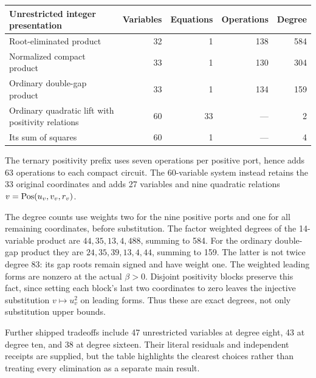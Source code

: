 \begin{center}
\small
\begin{tabular}{@{}lrrrr@{}}
\toprule
Unrestricted integer presentation & Variables & Equations & Operations & Degree\\
\midrule
Root-eliminated product & 32 & 1 & 138 & 584\\
Normalized compact product & 33 & 1 & 130 & 304\\
Ordinary double-gap product & 33 & 1 & 134 & 159\\
Ordinary quadratic lift with positivity relations & 60 & 33 & --- & 2\\
Its sum of squares & 60 & 1 & --- & 4\\
\bottomrule
\end{tabular}
\end{center}
The ternary positivity prefix uses seven operations per positive port, hence adds 63 operations to each compact circuit. The 60-variable system instead retains the 33 original coordinates and adds 27 variables and nine quadratic relations $v=\operatorname{Pos}(u_v,v_v,r_v)$.

The degree counts use weights two for the nine positive ports and one for all remaining coordinates, before substitution. The factor weighted degrees of the 14-variable product are $44,35,13,4,488$, summing to 584. For the ordinary double-gap product they are $24,35,39,13,4,44$, summing to 159. The latter is not twice degree 83: its gap roots remain signed and have weight one. The weighted leading forms are nonzero at the actual $\beta>0$. Disjoint positivity blocks preserve this fact, since setting each block's last two coordinates to zero leaves the injective substitution $v\mapsto u_v^2$ on leading forms. Thus these are exact degrees, not only substitution upper bounds.

Further shipped tradeoffs include 47 unrestricted variables at degree eight, 43 at degree ten, and 38 at degree sixteen. Their literal residuals and independent receipts are supplied, but the table highlights the clearest choices rather than treating every elimination as a separate main result.
